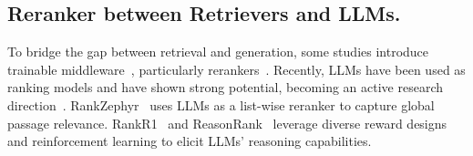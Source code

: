\documentclass[11pt]{article}
\begin{document}
\subsection{Reranker between Retrievers and LLMs.}




To bridge the gap between retrieval and generation, some studies introduce trainable middleware~\citep{jiang2025gainrag,dong2025understand}, particularly rerankers~\citep{glass2022re2g}. Recently, LLMs have been used as ranking models and have shown strong potential, becoming an active research direction~\citep{pradeep2023rankzephyr,weller2025rank1,zhuang2024setwise,liu2025reasonrank}. RankZephyr~\citep{pradeep2023rankzephyr} uses LLMs as a list-wise reranker to capture global passage relevance. RankR1~\citep{zhuang2025rank} and ReasonRank~\citep{liu2025reasonrank} leverage diverse reward designs and reinforcement learning to elicit LLMs' reasoning capabilities.

\end{document}

